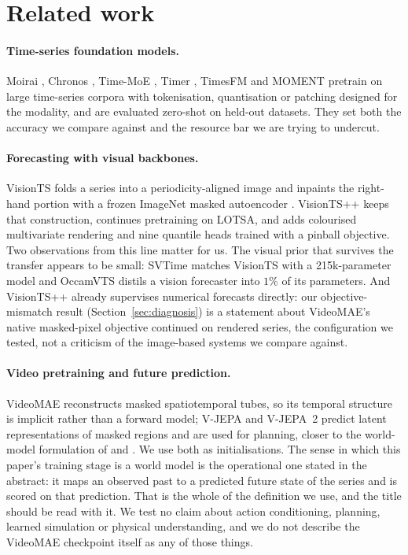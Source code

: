 \section{Related work}
\label{sec:related}

\paragraph{Time-series foundation models.}
Moirai \citep{moirai}, Chronos \citep{chronos}, Time-MoE \citep{timemoe}, Timer \citep{timer},
TimesFM \citep{timesfm} and MOMENT \citep{moment} pretrain on large time-series corpora with
tokenisation, quantisation or patching designed for the modality, and are evaluated zero-shot on
held-out datasets. They set both the accuracy we compare against and the resource bar we are trying
to undercut.

\paragraph{Forecasting with visual backbones.}
VisionTS \citep{visionts} folds a series into a periodicity-aligned image and inpaints the
right-hand portion with a frozen ImageNet masked autoencoder \citep{mae}. VisionTS++
\citep{visiontspp} keeps that construction, continues pretraining on LOTSA, and adds colourised
multivariate rendering and nine quantile heads trained with a pinball objective. Two observations
from this line matter for us. The visual prior that survives the transfer appears to be small:
SVTime \citep{svtime} matches VisionTS with a 215k-parameter model and OccamVTS \citep{occamvts}
distils a vision forecaster into $1\%$ of its parameters. And VisionTS++ already supervises numerical
forecasts directly: our objective-mismatch result (Section~\ref{sec:diagnosis}) is a statement about
VideoMAE's native masked-pixel objective continued on rendered series, the configuration we tested,
not a criticism of the image-based systems we compare against.

\paragraph{Video pretraining and future prediction.}
VideoMAE \citep{videomae} reconstructs masked spatiotemporal tubes, so its temporal structure is
implicit rather than a forward model; V-JEPA \citep{vjepa} and V-JEPA~2 \citep{vjepa2} predict
latent representations of masked regions and are used for planning, closer to the world-model
formulation of \citet{lecun2022} and \citet{dreamer}. We use both as initialisations. The sense in which
this paper's training stage is a world model is the operational one stated in the abstract: it maps
an observed past to a predicted future state of the series and is scored on that prediction. That is
the whole of the definition we use, and the title should be read with it. We test no claim about
action conditioning, planning, learned simulation or physical understanding, and we do not describe
the VideoMAE checkpoint itself as any of those things.

